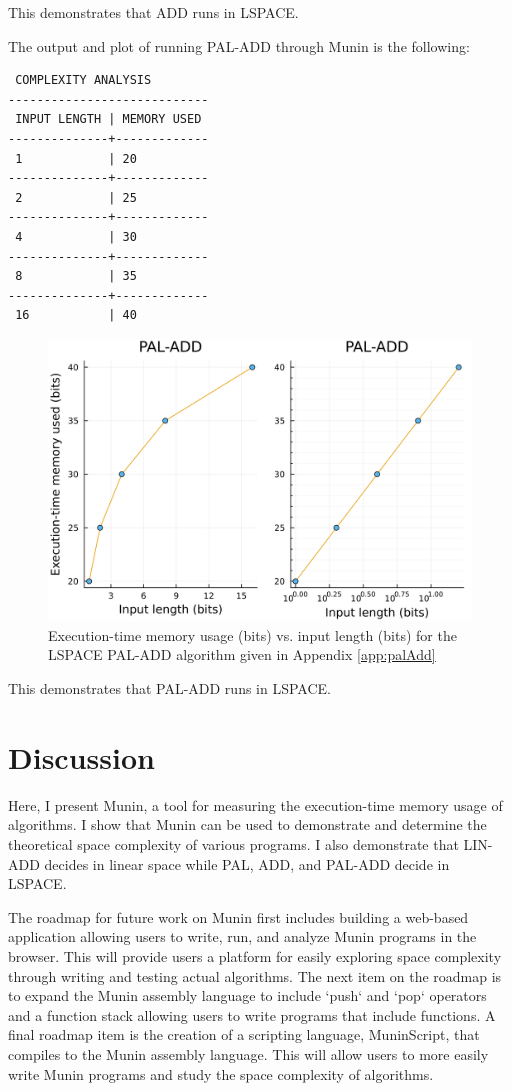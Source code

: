 \documentclass[11pt, a4paper]{article}
\begin{document}
This demonstrates that ADD runs in LSPACE.

The output and plot of running PAL-ADD through Munin is the following:

\begin{lstlisting}
 COMPLEXITY ANALYSIS
----------------------------
 INPUT LENGTH | MEMORY USED 
--------------+-------------
 1            | 20      
--------------+-------------
 2            | 25      
--------------+-------------
 4            | 30      
--------------+-------------
 8            | 35      
--------------+-------------
 16           | 40      
\end{lstlisting}

\begin{figure}[H]
    \centering
    \includegraphics[width=\columnwidth]{PAL-ADD.png}
    \caption{Execution-time memory usage (bits) vs. input length (bits) for the LSPACE PAL-ADD algorithm given in Appendix \ref{app:palAdd}}
    \label{fig:palAdd}
\end{figure}

This demonstrates that PAL-ADD runs in LSPACE.

\section{Discussion}

Here, I present Munin, a tool for measuring the execution-time memory usage of algorithms.
I show that Munin can be used to demonstrate and determine the theoretical space complexity of various programs.
I also demonstrate that LIN-ADD decides in linear space while PAL, ADD, and PAL-ADD decide in LSPACE.

The roadmap for future work on Munin first includes building a web-based application allowing users to write, run, and analyze Munin programs in the browser.
This will provide users a platform for easily exploring space complexity through writing and testing actual algorithms.
The next item on the roadmap is to expand the Munin assembly language to include `push` and `pop` operators and a function stack allowing users to write programs that include functions.
A final roadmap item is the creation of a scripting language, MuninScript, that compiles to the Munin assembly language.
This will allow users to more easily write Munin programs and study the space complexity of algorithms.
\end{document}

